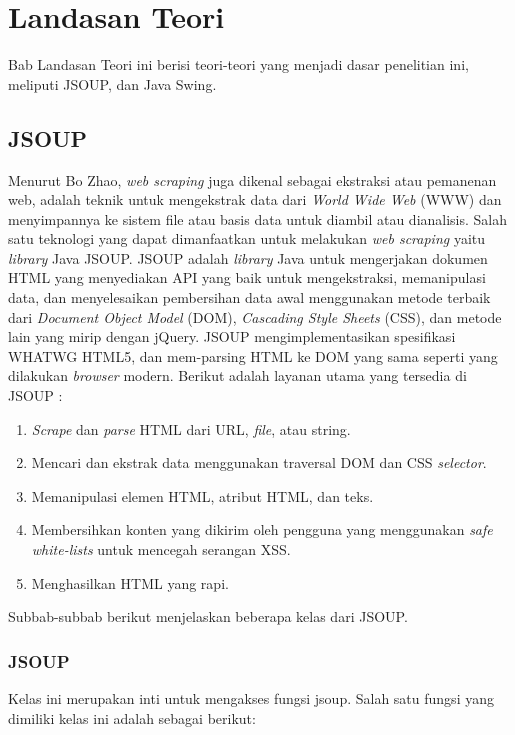 \chapter{Landasan Teori}
\label{chap:teori}

Bab Landasan Teori ini berisi teori-teori yang menjadi dasar penelitian ini, meliputi JSOUP, dan Java Swing.

\section{JSOUP}
\label{sec:JSOUP} 
 
Menurut Bo Zhao\cite{zhao}, \textit{web scraping} juga dikenal sebagai ekstraksi atau pemanenan web, adalah teknik untuk mengekstrak data dari \textit{World Wide Web} (WWW) dan menyimpannya ke sistem file atau basis data untuk diambil atau dianalisis. Salah satu teknologi yang dapat dimanfaatkan untuk melakukan \textit{web scraping} yaitu \textit{library} Java JSOUP. JSOUP adalah \textit{library} Java untuk mengerjakan dokumen HTML yang menyediakan API yang baik untuk mengekstraksi, memanipulasi data, dan menyelesaikan pembersihan data awal menggunakan metode terbaik dari \textit{Document Object Model} (DOM), \textit{Cascading Style Sheets} (CSS), dan metode lain yang mirip dengan jQuery. JSOUP mengimplementasikan spesifikasi WHATWG HTML5, dan mem-parsing HTML ke DOM yang sama seperti yang dilakukan \textit{browser} modern. Berikut adalah layanan utama yang tersedia di JSOUP \cite{cokrowibowo}:
\begin{enumerate}
    \item \textit{Scrape} dan \textit{parse} HTML dari URL, \textit{file}, atau string.
    \item Mencari dan ekstrak data menggunakan traversal DOM dan CSS \textit{selector}.
    \item Memanipulasi elemen HTML, atribut HTML, dan teks.
    \item Membersihkan konten yang dikirim oleh pengguna yang menggunakan \textit{safe white-lists} untuk mencegah serangan XSS.
    \item Menghasilkan HTML yang rapi.
\end{enumerate}

Subbab-subbab berikut menjelaskan beberapa kelas dari JSOUP.

\subsection{JSOUP}
Kelas ini merupakan inti untuk mengakses fungsi jsoup. Salah satu fungsi yang dimiliki kelas
ini adalah sebagai berikut:


